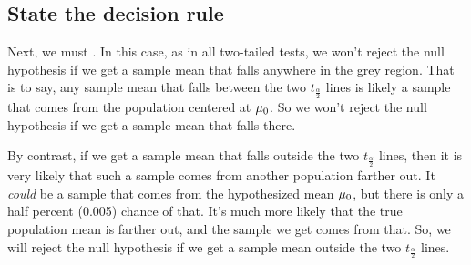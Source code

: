 \documentclass[../../../main.tex]{subfiles}
\begin{document}
\begin{center}
\end{center}


\subsection{State the decision rule}

Next, we must . In this case, as in all two-tailed tests, we won't reject the null hypothesis if we get a sample mean that falls anywhere in the grey region. That is to say, any sample mean that falls between the two $t_{\frac{\alpha}{2}}$ lines is likely a sample that comes from the population centered at $\HypPopMean/$. So we won't reject the null hypothesis if we get a sample mean that falls there.

By contrast, if we get a sample mean that falls outside the two $t_{\frac{\alpha}{2}}$ lines, then it is very likely that such a sample comes from another population farther out. It \emph{could} be a sample that comes from the hypothesized mean $\HypPopMean/$, but there is only a half percent (0.005) chance of that. It's much more likely that the true population mean is farther out, and the sample we get comes from that. So, we will reject the null hypothesis if we get a sample mean outside the two $t_{\frac{\alpha}{2}}$ lines.
\end{document}
